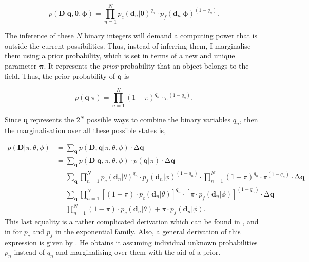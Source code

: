 \begin{equation}
p(\mathbf{D}|\mathbf{q},\boldsymbol{\theta},\boldsymbol{\phi})= \prod_{n=1}^N {p_c(\mathbf{d}_n|\boldsymbol{\theta})}^{q_n}\cdot {p_f(\mathbf{d}_n|\boldsymbol{\phi})}^{(1-q_n)}.
\end{equation}

The inference of these $N$ binary integers will demand a computing power that is outside the current possibilities. Thus, instead of inferring them, I marginalise them using a prior probability, which is set in terms of a new and unique parameter $\boldsymbol{\pi}$. It represents the \emph{prior} probability that an object belongs to the field. Thus, the prior probability of $\mathbf{q}$ is

\begin{equation}
p(\mathbf{q}|\pi)= \prod_{n=1}^N {(1-\pi)}^{q_n}\cdot {\pi}^{(1-q_n)}.
\end{equation}

Since $\mathbf{q}$ represents the $2^N$ possible ways to combine the binary variables $q_n$, then the marginalisation over all these possible states is,

\begin{align}
p(\mathbf{D}|\pi,\theta,\phi)&=\sum_{\mathbf{q}} p(\mathbf{D},\mathbf{q}|\pi,\theta,\phi)\cdot \mathrm{\Delta}\mathbf{q} \nonumber\\
&=\sum_{\mathbf{q}} p(\mathbf{D}|\mathbf{q},\pi,\theta,\phi)\cdot p(\mathbf{q}|\pi)\cdot \mathrm{\Delta}\mathbf{q} \nonumber \\
&=\sum_{\mathbf{q}} \prod_{n=1}^N {p_c(\mathbf{d}_n|\theta)}^{q_n}\cdot {p_f(\mathbf{d}_n|\phi)}^{(1-q_n)}\cdot \prod_{n=1}^N {(1-\pi)}^{q_n}\cdot {\pi}^{(1-q_n)}\cdot \mathrm{\Delta}\mathbf{q} \nonumber \\
&=\sum_{\mathbf{q}} \prod_{n=1}^N \left[(1-\pi)\cdot p_c(\mathbf{d}_n|\theta)\right]^{q_n}\cdot \left[\pi\cdot p_f(\mathbf{d}_n|\phi)\right]^{(1-q_n)}\cdot \mathrm{\Delta}\mathbf{q} \nonumber \\
&=\prod_{n=1}^N (1-\pi)\cdot p_c(\mathbf{d}_n|\theta) + \pi\cdot p_f(\mathbf{d}_n|\phi).
\end{align}
This last equality is a rather complicated derivation which can be found in \citet{Press1997}, and in \citet{Hogg2010a} for $p_c$ and $p_f$ in the exponential family. Also, a general derivation of this expression is given by \citet{Jaynes2003}. He obtains it assuming individual unknown probabilities $p_n$ instead of $q_n$ and marginalising over them with the aid of a prior.

